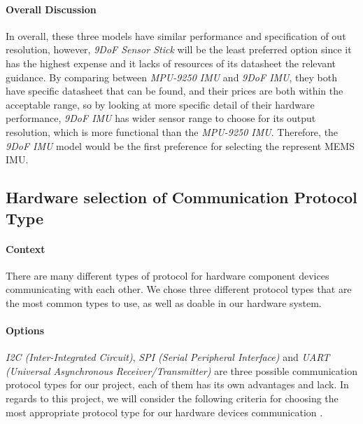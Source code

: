 \hfill \break
\paragraph{Overall Discussion}
In overall, these three models have similar performance and specification of out resolution, however, \textit{9DoF Sensor Stick} will be the least preferred option since it has the highest expense and it lacks of resources of its datasheet the relevant guidance. By comparing between \textit{MPU-9250 IMU} and \textit{9DoF IMU}, they both have specific datasheet that can be found, and their prices are both within the acceptable range, so by looking at more specific detail of their hardware performance, \textit{9DoF IMU} has wider sensor range to choose for its output resolution, which is more functional than the \textit{MPU-9250 IMU}. Therefore, the \textit{9DoF IMU} model would be the first preference for selecting the represent MEMS IMU.




\subsection{Hardware selection of Communication Protocol Type}
\paragraph{Context}
There are many different types of protocol for hardware component devices communicating with each other. We chose three different protocol types that are the most common types to use, as well as doable in our hardware system.\\

\paragraph{Options}
\textit{I2C (Inter-Integrated Circuit)}, \textit{SPI (Serial Peripheral Interface)} and \textit{UART (Universal Asynchronous Receiver/Transmitter)} are three possible communication protocol types for our project, each of them has its own advantages and lack. In regards to this project, we will consider the following criteria for choosing the most appropriate protocol type for our hardware devices communication \cite{protocol1}.\\

